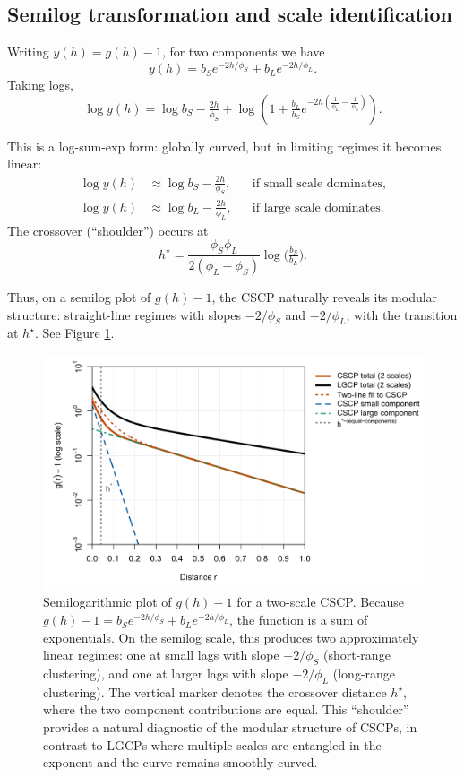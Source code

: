 \documentclass[11pt]{article}
\begin{document}
\subsection{Semilog transformation and scale identification}
Writing $y(h)=g(h)-1$, for two components we have
\[
y(h) = b_S e^{-2h/\phi_S} + b_L e^{-2h/\phi_L}.
\]
Taking logs,
\[
\log y(h) = \log b_S - \tfrac{2h}{\phi_S} 
+ \log\!\left(1 + \tfrac{b_L}{b_S} e^{-2h\left(\tfrac{1}{\phi_L}-\tfrac{1}{\phi_S}\right)}\right).
\]

This is a log-sum-exp form: globally curved, but in limiting regimes it becomes linear:
\begin{align*}
	\log y(h) &\approx \log b_S - \tfrac{2h}{\phi_S}, && \text{if small scale dominates},\\
	\log y(h) &\approx \log b_L - \tfrac{2h}{\phi_L}, && \text{if large scale dominates}.
\end{align*}
The crossover (“shoulder”) occurs at 
\[
h^\star = \frac{\phi_S \phi_L}{2(\phi_L - \phi_S)} 
\log\!\Big(\tfrac{b_S}{b_L}\Big).
\]

Thus, on a semilog plot of $g(h)-1$, the CSCP naturally reveals its modular structure: 
straight-line regimes with slopes $-2/\phi_S$ and $-2/\phi_L$, with the transition at $h^\star$. See Figure \ref{fig:csclgcp-semilog}.


\begin{figure}[h]
	\centering
	\includegraphics[width=1\textwidth]{semilog_gminus1_with_LGCP.png}
	\caption{Semilogarithmic plot of $g(h)-1$ for a two-scale CSCP. 
		Because $g(h)-1 = b_S e^{-2h/\phi_S} + b_L e^{-2h/\phi_L}$, the function is a sum of exponentials. 
		On the semilog scale, this produces two approximately linear regimes: one at small lags with slope $-2/\phi_S$ (short-range clustering), 
		and one at larger lags with slope $-2/\phi_L$ (long-range clustering). 
		The vertical marker denotes the crossover distance $h^\star$, where the two component contributions are equal. 
		This ``shoulder'' provides a natural diagnostic of the modular structure of CSCPs, 
		in contrast to LGCPs where multiple scales are entangled in the exponent and the curve remains smoothly curved.}
	\label{fig:csclgcp-semilog}
\end{figure}
\end{document}
